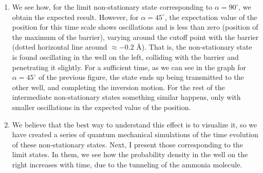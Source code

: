 \documentclass[12pt, a4paper]{article}
\begin{document}
\begin{enumerate}[label=\textbf{Slide \arabic*.}]
    \item We see how, for the limit non-stationary state corresponding to $\alpha=90^{\circ}$, we obtain the expected result. However, for $\alpha = 45^{\circ}$, the expectation value of the position for this time scale shows oscillations and is less than zero (position of the maximum of the barrier), varying around the cutoff point with the barrier (dotted horizontal line around $\approx -0.2$ \AA). That is, the non-stationary state is found oscillating in the well on the left, colliding with the barrier and penetrating it slightly. For a sufficient time, as we can see in the graph for $\alpha = 45^{\circ}$ of the previous figure, the state ends up being transmitted to the other well, and completing the inversion motion. For the rest of the intermediate non-stationary states something similar happens, only with smaller oscillations in the expected value of the position.

    \item We believe that the best way to understand this effect is to visualize it, so we have created a series of quantum mechanical simulations of the time evolution of these non-stationary states. Next, I present those corresponding to the limit states. In them, we see how the probability density in the well on the right increases with time, due to the tunneling of the ammonia molecule.


\end{enumerate}
\end{document}
